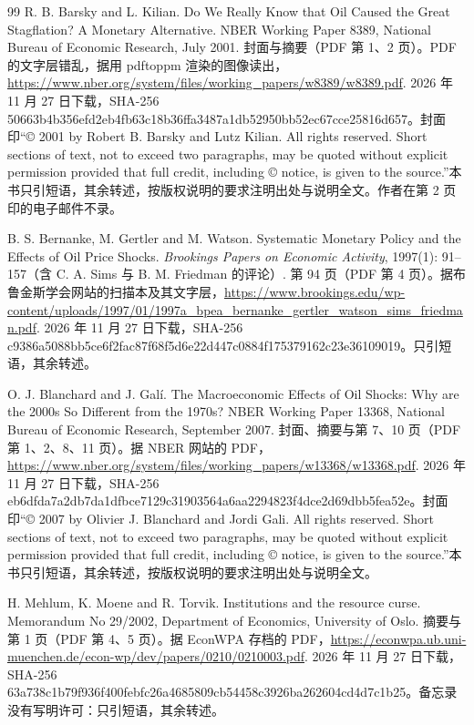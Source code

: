\begin{thebibliography}{99}
 R. B. Barsky and L. Kilian. Do We Really Know that Oil Caused the Great Stagflation? A Monetary Alternative. NBER Working Paper 8389, National Bureau of Economic Research, July 2001. 封面与摘要（PDF 第 1、2 页）。PDF 的文字层错乱，据用 pdftoppm 渲染的图像读出，\url{https://www.nber.org/system/files/working_papers/w8389/w8389.pdf}. 2026 年 11 月 27 日下载，SHA-256 50663b4b356efd2eb4fb63c18b36ffa3487a1db52950bb52ec67cce25816d657。封面印“© 2001 by Robert B. Barsky and Lutz Kilian. All rights reserved. Short sections of text, not to exceed two paragraphs, may be quoted without explicit permission provided that full credit, including © notice, is given to the source.”本书只引短语，其余转述，按版权说明的要求注明出处与说明全文。作者在第 2 页印的电子邮件不录。

 B. S. Bernanke, M. Gertler and M. Watson. Systematic Monetary Policy and the Effects of Oil Price Shocks. \emph{Brookings Papers on Economic Activity}, 1997(1): 91--157（含 C. A. Sims 与 B. M. Friedman 的评论）. 第 94 页（PDF 第 4 页）。据布鲁金斯学会网站的扫描本及其文字层，\url{https://www.brookings.edu/wp-content/uploads/1997/01/1997a_bpea_bernanke_gertler_watson_sims_friedman.pdf}. 2026 年 11 月 27 日下载，SHA-256 c9386a5088bb5ce6f2fac87f68f5d6e22d447c0884f175379162c23e36109019。只引短语，其余转述。

 O. J. Blanchard and J. Galí. The Macroeconomic Effects of Oil Shocks: Why are the 2000s So Different from the 1970s? NBER Working Paper 13368, National Bureau of Economic Research, September 2007. 封面、摘要与第 7、10 页（PDF 第 1、2、8、11 页）。据 NBER 网站的 PDF，\url{https://www.nber.org/system/files/working_papers/w13368/w13368.pdf}. 2026 年 11 月 27 日下载，SHA-256 eb6dfda7a2db7da1dfbce7129c31903564a6aa2294823f4dce2d69dbb5fea52e。封面印“© 2007 by Olivier J. Blanchard and Jordi Gali. All rights reserved. Short sections of text, not to exceed two paragraphs, may be quoted without explicit permission provided that full credit, including © notice, is given to the source.”本书只引短语，其余转述，按版权说明的要求注明出处与说明全文。

 H. Mehlum, K. Moene and R. Torvik. Institutions and the resource curse. Memorandum No 29/2002, Department of Economics, University of Oslo. 摘要与第 1 页（PDF 第 4、5 页）。据 EconWPA 存档的 PDF，\url{https://econwpa.ub.uni-muenchen.de/econ-wp/dev/papers/0210/0210003.pdf}. 2026 年 11 月 27 日下载，SHA-256 63a738c1b79f936f400febfc26a4685809cb54458c3926ba262604cd4d7c1b25。备忘录没有写明许可：只引短语，其余转述。

\end{thebibliography}
